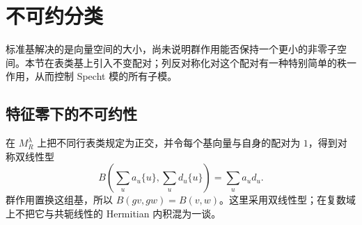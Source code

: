 \section{不可约分类}
\label{b5:sec:0604}

标准基解决的是向量空间的大小，尚未说明群作用能否保持一个更小的非零子空间。本节在表类基上引入不变配对；列反对称化对这个配对有一种特别简单的秩一作用，从而控制 Specht 模的所有子模。

\subsection{特征零下的不可约性}
\label{b5:subsec:0604:01}

在 \(M_R^\lambda\) 上把不同行表类规定为正交，并令每个基向量与自身的配对为 \(1\)，得到对称双线性型
\[
	B\left(\sum_u a_u\{u\},\sum_u d_u\{u\}\right)=\sum_u a_ud_u.
\]
群作用置换这组基，所以 \(B(gv,gw)=B(v,w)\)。这里采用双线性型；在复数域上不把它与共轭线性的 Hermitian 内积混为一谈。

